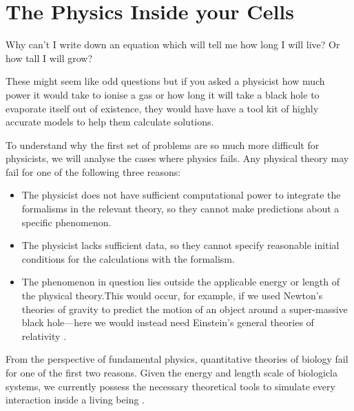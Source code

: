 

\section{The Physics Inside your Cells}

Why can't I write down an equation which will tell me how long I will live? Or how tall I will grow?

These might seem like odd questions but if you asked a physicist how much power it would take to ionise a gas or how long it will take a black hole to evaporate itself out of existence, they would have have a tool kit of highly accurate models to help them calculate solutions. 

To understand why the first set of problems are so much more difficult for physicists, we will analyse the cases where physics fails. Any physical theory may fail for one of the following three reasons: 

\begin{itemize} 
	\item The physicist does not have sufficient computational power to integrate the formalisms in the relevant theory, so they cannot make predictions about a specific phenomenon.

		\item The physicist lacks sufficient data, so they cannot specify reasonable initial conditions for the calculations with the formalism. 

		\item The phenomenon in question lies outside the applicable energy or length of the physical theory.This would occur, for example, if we used Newton's theories of gravity to predict the motion of an object around a super-massive black hole---here we would instead need Einstein's general theories of relativity \cite{picker2022}.

\end{itemize}

From the perspective of fundamental physics, quantitative theories of biology fail for one of the first two reasons. Given the energy and length scale of biologicla systems, we currently possess the necessary theoretical tools to simulate every interaction inside a living being \cite{carroll2021}. 

